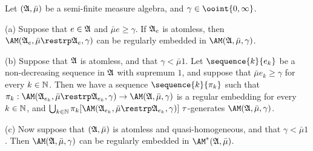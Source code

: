  Let $(\frak A,\bar\mu)$ be a semi-finite
measure algebra, and $\gamma\in\ooint{0,\infty}$.

(a) Suppose that $e\in\frak A$ and $\bar\mu e\ge\gamma$.
If $\frak A_e$ is atomless, then
$\AM(\frak A_e,\bar\mu\restrp\frak A_e,\gamma)$ can be regularly
embedded in $\AM(\frak A,\bar\mu,\gamma)$.

(b)
Suppose that $\frak A$ is atomless, and that $\gamma<\bar\mu 1$.
Let $\sequence{k}{e_k}$ be a non-decreasing sequence in $\frak A$
with supremum $1$, and
suppose that $\bar\mu e_k\ge\gamma$ for every $k\in\Bbb N$.   Then
we have a sequence $\sequence{k}{\pi_k}$ such that
$\pi_k:\AM(\frak A_{e_k},\bar\mu\restrp\frak A_{e_k},\gamma)\to
\AM(\frak A,\bar\mu,\gamma)$ is a regular embedding for every
$k\in\Bbb N$, and
$\bigcup_{k\in\Bbb N}
\pi_k[\AM(\frak A_{e_k},\bar\mu\restrp\frak A_{e_k},\gamma)]
\,\,\tau$-generates $\AM(\frak A,\bar\mu,\gamma)$.

(c) Now suppose that $(\frak A,\bar\mu)$ is atomless
and quasi-homogeneous, and that $\gamma<\bar\mu 1$.   Then
$\AM(\frak A,\bar\mu,\gamma)$ can be regularly
embedded in $\AM^*(\frak A,\bar\mu)$.

